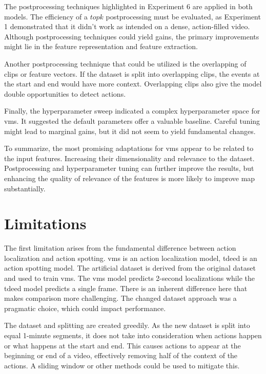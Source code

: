 The postprocessing techniques highlighted in Experiment 6 are applied in both models. The efficiency of a $topk$ postprocessing must be evaluated, as Experiment 1 demonstrated that it didn't work as intended on a dense, action-filled video. Although postprocessing techniques could yield gains, the primary improvements might lie in the feature representation and feature extraction. 

Another postprocessing technique that could be utilized is the overlapping of clips or feature vectors. If the dataset is split into overlapping clips, the events at the start and end would have more context. Overlapping clips also give the model double opportunities to detect actions.

Finally, the hyperparameter sweep indicated a complex hyperparameter space for \acrshort{vms}. It suggested the default parameters offer a valuable baseline. Careful tuning might lead to marginal gains, but it did not seem to yield fundamental changes. 

To summarize, the most promising adaptations for \acrshort{vms} appear to be related to the input features. Increasing their dimensionality and relevance to the dataset.  Postprocessing and hyperparameter tuning can further improve the results, but enhancing the quality of relevance of the features is more likely to improve \acrshort{map} substantially.


\section{Limitations}


The first limitation arises from the fundamental difference between action localization and action spotting. \acrshort{vms} is an action localization model, \acrshort{tdeed} is an action spotting model. The artificial dataset is derived from the original dataset and used to train \acrshort{vms}. The \acrshort{vms} model predicts 2-second localizations while the \acrshort{tdeed} model predicts a single frame. There is an inherent difference here that makes comparison more challenging. The changed dataset approach was a pragmatic choice, which could impact performance. 

The dataset and splitting are created greedily. As the new dataset is split into equal 1-minute segments, it does not take into consideration when actions happen or what happens at the start and end. This causes actions to appear at the beginning or end of a video, effectively removing half of the context of the actions. A sliding window or other methods could be used to mitigate this. 


